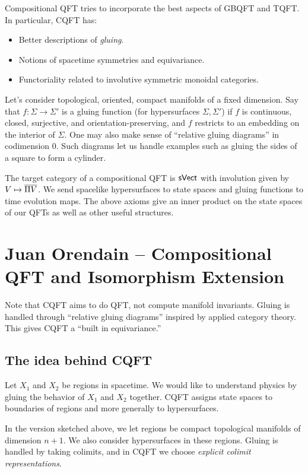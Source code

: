 \documentclass{amsart}
\begin{document}
Compositional QFT tries to incorporate the best aspects of GBQFT and TQFT.
In particular, CQFT has:
\begin{itemize}
  \item Better descriptions of \emph{gluing}.
  \item Notions of spacetime symmetries and equivariance.
  \item Functoriality related to involutive symmetric monoidal categories.
\end{itemize}

Let's consider topological, oriented, compact manifolds of a fixed dimension.
Say that $f: \Sigma \to \Sigma'$ is a gluing function (for hypersurfaces $\Sigma, \Sigma'$) if $f$ is continuous, closed, surjective, and orientation-preserving, and $f$ restricts to an embedding on the interior of $\Sigma$.
One may also make sense of ``relative gluing diagrams'' in codimension $0$.
Such diagrams let us handle examples such as gluing the sides of a square to form a cylinder.

The target category of a compositional QFT is $\mathsf{sVect}$ with involution given by $V \mapsto \overline{\Pi V}$.
We send spacelike hypersurfaces to state spaces and gluing functions to time evolution maps.
The above axioms give an inner product on the state spaces of our QFTs as well as other useful structures.

\section{Juan Orendain -- Compositional QFT and Isomorphism Extension}

Note that CQFT aims to do QFT, not compute manifold invariants.
Gluing is handled through ``relative gluing diagrams'' inspired by applied category theory.
This gives CQFT a ``built in equivariance.''

\subsection{The idea behind CQFT}

Let $X_1$ and $X_2$ be regions in spacetime.
We would like to understand physics by gluing the behavior of $X_1$ and $X_2$ together.
CQFT assigns state spaces to boundaries of regions and more generally to hypersurfaces.

In the version sketched above, we let regions be compact topological manifolds of dimension $n + 1$.
We also consider hypersurfaces in these regions.
Gluing is handled by taking colimits, and in CQFT we choose \emph{explicit colimit representations}.
\end{document}
